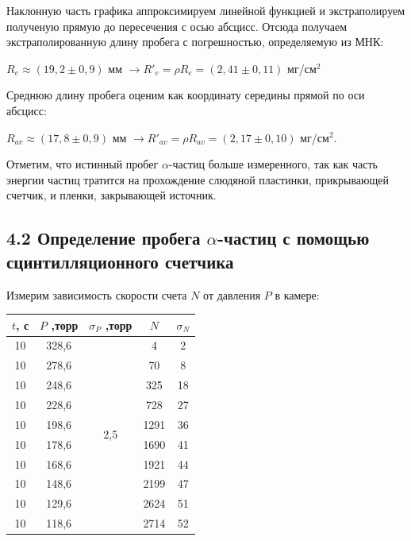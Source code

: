 \documentclass[a4paper,12pt]{report}
\begin{document}
Наклонную часть графика аппроксимируем линейной функцией и экстраполируем полученую прямую до пересечения с осью абсцисс. Отсюда получаем экстраполированную длину пробега с погрешностью, определяемую из МНК:

\begin{center}
    $R_{e} \approx (19,2 \pm 0,9)$ мм $\rightarrow R'_{e} = \rho R_{e} = (2,41 \pm 0,11)$ мг/см$^2$
\end{center}
	
Среднюю длину пробега оценим как координату середины прямой по оси абсцисс:

$R_{av}\approx (17,8\pm0,9)$ мм $ \rightarrow R'_{av}=\rho R_{av}=(2,17\pm0,10)$ мг/см$^2$. 

Отметим, что истинный пробег $\alpha$-частиц больше измеренного, так как часть энергии частиц тратится на прохождение слюдяной пластинки, прикрывающей счетчик, и пленки, закрывающей источник.

\subsection*{4.2 Определение пробега $\alpha$-частиц с помощью сцинтилляционного счетчика}

Измерим зависимость скорости счета $N$ от давления $P$ в камере:

\begin{table}[H]
\begin{tabular}{|c|c|c|c|c|}
\hline
$t$, с & $P$ ,торр & $\sigma_{P}$ ,торр          & $N$    & $\sigma_N$ \\ \hline
10   & 328,6   & \multirow{10}{*}{2,5} & 4    & 2      \\ \cline{1-2} \cline{4-5} 
10   & 278,6   &                       & 70   & 8      \\ \cline{1-2} \cline{4-5} 
10   & 248,6   &                       & 325  & 18     \\ \cline{1-2} \cline{4-5} 
10   & 228,6   &                       & 728  & 27     \\ \cline{1-2} \cline{4-5} 
10   & 198,6   &                       & 1291 & 36     \\ \cline{1-2} \cline{4-5} 
10   & 178,6   &                       & 1690 & 41     \\ \cline{1-2} \cline{4-5} 
10   & 168,6   &                       & 1921 & 44     \\ \cline{1-2} \cline{4-5} 
10   & 148,6   &                       & 2199 & 47     \\ \cline{1-2} \cline{4-5} 
10   & 129,6   &                       & 2624 & 51     \\ \cline{1-2} \cline{4-5} 
10   & 118,6   &                       & 2714 & 52     \\ \hline
\end{tabular}
\end{table}
\end{document}
